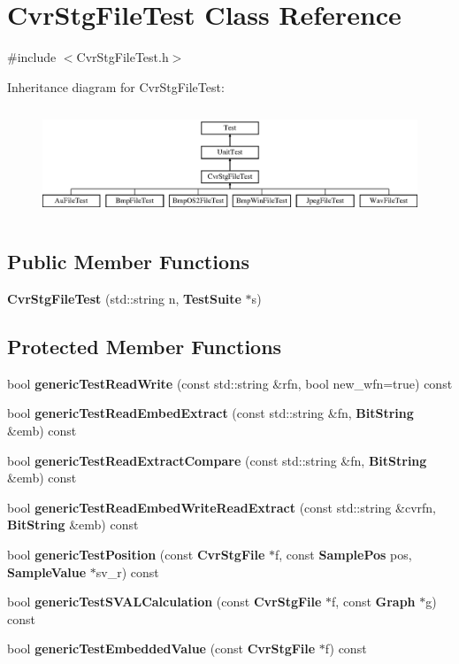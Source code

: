 \section{Cvr\+Stg\+File\+Test Class Reference}
\label{classCvrStgFileTest}


{\ttfamily \#include $<$Cvr\+Stg\+File\+Test.\+h$>$}

Inheritance diagram for Cvr\+Stg\+File\+Test\+:\begin{figure}[H]
\begin{center}
\leavevmode
\includegraphics[height=3.303835cm]{classCvrStgFileTest}
\end{center}
\end{figure}
\subsection*{Public Member Functions}
\begin{DoxyCompactItemize}
\item 
\textbf{ Cvr\+Stg\+File\+Test} (std\+::string n, \textbf{ Test\+Suite} $\ast$s)
\end{DoxyCompactItemize}
\subsection*{Protected Member Functions}
\begin{DoxyCompactItemize}
\item 
bool \textbf{ generic\+Test\+Read\+Write} (const std\+::string \&rfn, bool new\+\_\+wfn=true) const
\item 
bool \textbf{ generic\+Test\+Read\+Embed\+Extract} (const std\+::string \&fn, \textbf{ Bit\+String} \&emb) const
\item 
bool \textbf{ generic\+Test\+Read\+Extract\+Compare} (const std\+::string \&fn, \textbf{ Bit\+String} \&emb) const
\item 
bool \textbf{ generic\+Test\+Read\+Embed\+Write\+Read\+Extract} (const std\+::string \&cvrfn, \textbf{ Bit\+String} \&emb) const
\item 
bool \textbf{ generic\+Test\+Position} (const \textbf{ Cvr\+Stg\+File} $\ast$f, const \textbf{ Sample\+Pos} pos, \textbf{ Sample\+Value} $\ast$sv\+\_\+r) const
\item 
bool \textbf{ generic\+Test\+S\+V\+A\+L\+Calculation} (const \textbf{ Cvr\+Stg\+File} $\ast$f, const \textbf{ Graph} $\ast$g) const
\item 
bool \textbf{ generic\+Test\+Embedded\+Value} (const \textbf{ Cvr\+Stg\+File} $\ast$f) const
\end{DoxyCompactItemize}
